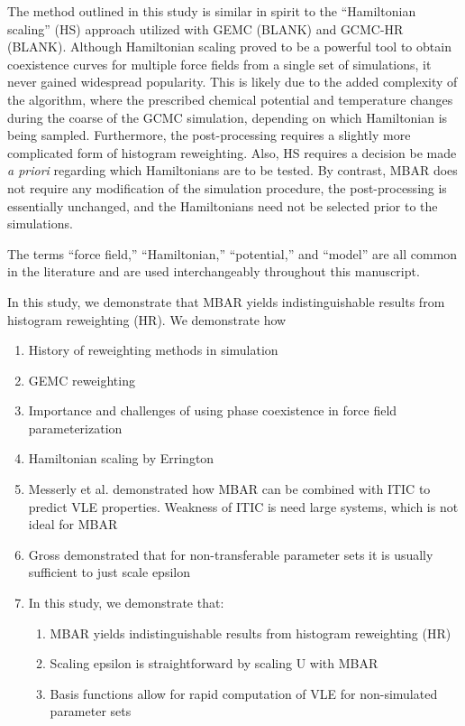 \documentclass[11pt,a4paper]{article}
\begin{document}

The method outlined in this study is similar in spirit to the ``Hamiltonian scaling'' (HS) approach utilized with GEMC (BLANK) and GCMC-HR (BLANK). Although Hamiltonian scaling proved to be a powerful tool to obtain coexistence curves for multiple force fields from a single set of simulations, it never gained widespread popularity. This is likely due to the added complexity of the algorithm, where the prescribed chemical potential and temperature changes during the coarse of the GCMC simulation, depending on which Hamiltonian is being sampled. Furthermore, the post-processing requires a slightly more complicated form of histogram reweighting. Also, HS requires a decision be made \textit{a priori} regarding which Hamiltonians are to be tested. By contrast, MBAR does not require any modification of the simulation procedure, the post-processing is essentially unchanged, and the Hamiltonians need not be selected prior to the simulations.

The terms ``force field,'' ``Hamiltonian,'' ``potential,'' and ``model'' are all common in the literature and are used interchangeably throughout this manuscript.


In this study, we demonstrate that MBAR yields indistinguishable results from histogram reweighting (HR). We demonstrate how 

\begin{enumerate}
	\item History of reweighting methods in simulation
	\item GEMC reweighting 
	\item Importance and challenges of using phase coexistence in force field parameterization
	\item Hamiltonian scaling by Errington
	\item Messerly et al. demonstrated how MBAR can be combined with ITIC to predict VLE properties. Weakness of ITIC is need large systems, which is not ideal for MBAR
	\item Gross demonstrated that for non-transferable parameter sets it is usually sufficient to just scale epsilon
	\item In this study, we demonstrate that:
	\begin{enumerate}
		\item MBAR yields indistinguishable results from histogram reweighting (HR)
		\item Scaling epsilon is straightforward by scaling U with MBAR
		\item Basis functions allow for rapid computation of VLE for non-simulated parameter sets
	\end{enumerate}
\end{enumerate}
\end{document}
